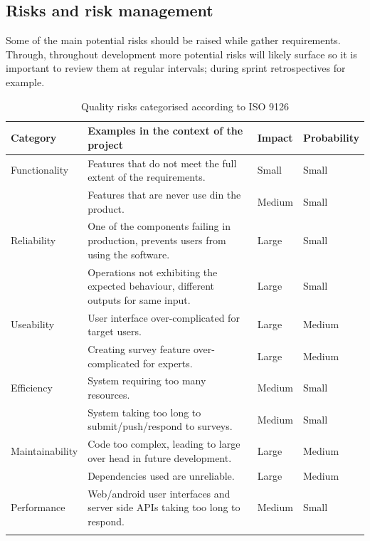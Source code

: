 \subsection{Risks and risk management}
Some of the main potential risks should be raised while gather requirements.
Through, throughout development more potential risks will likely surface so it is important to review them at regular intervals; during
sprint retrospectives for example.

\begin{longtable}{|p{}|p{}|p{}|p{}|}
    \hline
    Category        & Examples in the context of the project                                              & Impact & Probability   \\
    \hline\hline    
    Functionality   & Features that do not meet the full extent of the requirements.                      & Small  & Small         \\
                    & Features that are never use din the product.                                        & Medium & Small         \\
    \hline  
    Reliability     & One of the components failing in production, prevents users from using the software.& Large  & Small         \\
                    & Operations not exhibiting the expected behaviour, different outputs for same input. & Large  & Small         \\ 
    \hline  
    Useability      & User interface over-complicated for target users.                                   & Large  & Medium        \\
                    & Creating survey feature over-complicated for experts.                               & Large  & Medium        \\
    \hline  
    Efficiency      & System requiring too many resources.                                                & Medium & Small         \\
                    & System taking too long to submit/push/respond to surveys.                           & Medium & Small         \\     
    \hline
    Maintainability & Code too complex, leading to large over head in future development.                 & Large  & Medium        \\
                    & Dependencies used are unreliable.                                                   & Large  & Medium        \\
    \hline
    Performance     & Web/android user interfaces and server side APIs  taking too long to respond.       & Medium & Small         \\
    \hline
    
    \caption{Quality risks categorised according to ISO 9126}
\end{longtable}

\clearpage